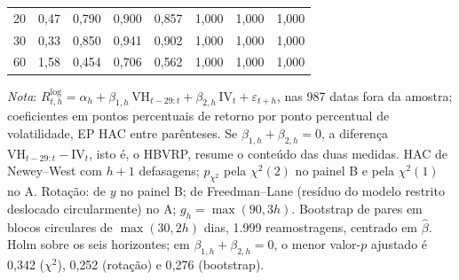 \begin{table}[H]
\begin{tabular}{rrrrrrrr}
20 & 0{,}47 & 0{,}790 & 0{,}900 & 0{,}857 & 1{,}000 & 1{,}000 & 1{,}000 \\
30 & 0{,}33 & 0{,}850 & 0{,}941 & 0{,}902 & 1{,}000 & 1{,}000 & 1{,}000 \\
60 & 1{,}58 & 0{,}454 & 0{,}706 & 0{,}562 & 1{,}000 & 1{,}000 & 1{,}000 \\
\bottomrule
\end{tabular}
\par\smallskip
\parbox{0.95\linewidth}{\footnotesize\textit{Nota}: $R^{\log}_{t,h} = \alpha_h + \beta_{1,h}\,\text{VH}_{t-29:t} + \beta_{2,h}\,\text{IV}_t + \varepsilon_{t+h}$, nas 987 datas fora da amostra; coeficientes em pontos percentuais de retorno por ponto percentual de volatilidade, EP HAC entre parênteses. Se $\beta_{1,h} + \beta_{2,h} = 0$, a diferença $\text{VH}_{t-29:t} - \text{IV}_t$, isto é, o HBVRP, resume o conteúdo das duas medidas. HAC de Newey--West com $h+1$ defasagens; $p_{\chi^2}$ pela $\chi^2(2)$ no painel B e pela $\chi^2(1)$ no A. Rotação: de $y$ no painel B; de Freedman--Lane (resíduo do modelo restrito deslocado circularmente) no A; $g_h = \max(90, 3h)$. Bootstrap de pares em blocos circulares de $\max(30, 2h)$ dias, 1.999 reamostragens, centrado em $\hat\beta$. Holm sobre os seis horizontes; em $\beta_{1,h} + \beta_{2,h} = 0$, o menor valor-$p$ ajustado é 0{,}342 ($\chi^2$), 0{,}252 (rotação) e 0{,}276 (bootstrap).}
\end{table}
